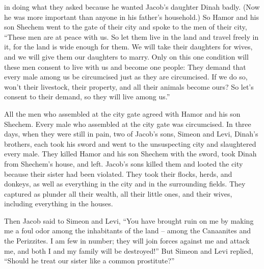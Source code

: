 {in doing
what
they asked because
he wanted
Jacob’s
daughter
Dinah badly. (Now he was more important than
anyone
in his father’s
household.)
So Hamor
and his son
Shechem
went
to
the gate
of their city
and spoke
to
the men
of their city,
“These
men
are at peace
with
us. So let them
live
in the land
and travel freely
in it, for the
land
is
wide
enough
for them. We will take
their daughters
for wives,
and we will give
them our daughters to marry.
Only
on this
one condition
will these men
consent to live
with
us and become
one
people: They demand that every
male
among us be circumcised
just
as they
are circumcised.
If we do so, won’t their
livestock,
their property,
and all
their
animals
become ours? So let’s consent
to their demand,
so they will live
among us.”
\par }{\PP {}All
the men who assembled
at the city
gate
agreed
with Hamor
and his son
Shechem.
Every
male
who assembled
at the city
gate
was circumcised.
In three
days,
when
they were still
in pain,
two
of Jacob’s
sons,
Simeon
and Levi,
Dinah’s
brothers,
each
took
his sword
and went
to
the unsuspecting
city
and slaughtered
every
male.
They killed
Hamor
and his
son
Shechem
with the sword,
took
Dinah
from Shechem’s
house,
and left.
Jacob’s
sons
killed
them and looted
the city
because
their sister
had been violated.
They took
their flocks,
herds,
and donkeys,
as well as everything
in the city
and in the surrounding fields.
They captured
as plunder
all
their wealth,
all
their little ones,
and their wives,
including everything
in the houses.
\par }{\PP {}Then Jacob
said
to
Simeon
and Levi,
“You have brought ruin
on
me by making me a foul odor
among the inhabitants
of the land
– among the Canaanites
and the Perizzites.
I
am few
in number;
they will join forces
against
me and attack
me, and both I
and my family
will be destroyed!”
But Simeon and Levi replied, “Should
he treat
our sister
like a common prostitute?”

}
